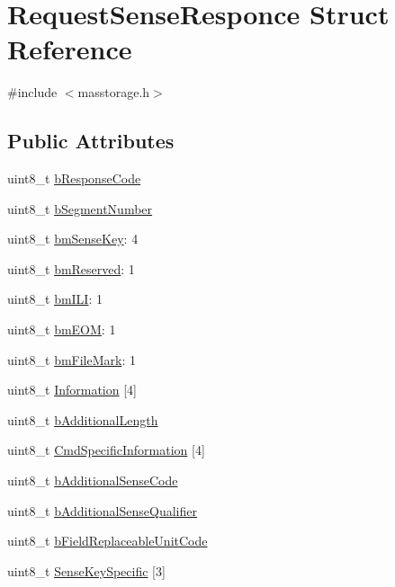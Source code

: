 \hypertarget{struct_request_sense_responce}{\section{\-Request\-Sense\-Responce \-Struct \-Reference}
\label{struct_request_sense_responce}
}


{\ttfamily \#include $<$masstorage.\-h$>$}

\subsection*{\-Public \-Attributes}
\begin{DoxyCompactItemize}
\item 
uint8\-\_\-t \hyperlink{struct_request_sense_responce_a7db2938d24b431077a52edd1b8c48557}{b\-Response\-Code}
\item 
uint8\-\_\-t \hyperlink{struct_request_sense_responce_a243e278d4598f7524e2fd48a45269af8}{b\-Segment\-Number}
\item 
uint8\-\_\-t \hyperlink{struct_request_sense_responce_affd71e9a5912c4752adb0cb108cf4118}{bm\-Sense\-Key}\-: 4
\item 
uint8\-\_\-t \hyperlink{struct_request_sense_responce_ae2d8ba719fa3365271924facb832b6d5}{bm\-Reserved}\-: 1
\item 
uint8\-\_\-t \hyperlink{struct_request_sense_responce_ae14c0df03bdb15da04b4db655a5a9b66}{bm\-I\-L\-I}\-: 1
\item 
uint8\-\_\-t \hyperlink{struct_request_sense_responce_a72c82a54965c687da13f217753f18f7d}{bm\-E\-O\-M}\-: 1
\item 
uint8\-\_\-t \hyperlink{struct_request_sense_responce_a7255f887c70660d714500b4131f7ab23}{bm\-File\-Mark}\-: 1
\item 
uint8\-\_\-t \hyperlink{struct_request_sense_responce_a4342aa28405753a185d867060fec931e}{\-Information} \mbox{[}4\mbox{]}
\item 
uint8\-\_\-t \hyperlink{struct_request_sense_responce_adbc6f965fe2820222504d1e8853f1518}{b\-Additional\-Length}
\item 
uint8\-\_\-t \hyperlink{struct_request_sense_responce_ab2f0cab24692ca29dffc231f31198726}{\-Cmd\-Specific\-Information} \mbox{[}4\mbox{]}
\item 
uint8\-\_\-t \hyperlink{struct_request_sense_responce_a554063acfa94e465da27a7dc73cf786a}{b\-Additional\-Sense\-Code}
\item 
uint8\-\_\-t \hyperlink{struct_request_sense_responce_a628379310065c48e738bd07037b329e6}{b\-Additional\-Sense\-Qualifier}
\item 
uint8\-\_\-t \hyperlink{struct_request_sense_responce_ada14013a7a12b33b5d1ed747a48d5fe0}{b\-Field\-Replaceable\-Unit\-Code}
\item 
uint8\-\_\-t \hyperlink{struct_request_sense_responce_a61d034714befc2fa0fb7dcea30942324}{\-Sense\-Key\-Specific} \mbox{[}3\mbox{]}
\end{DoxyCompactItemize}


